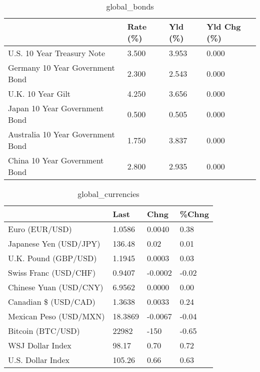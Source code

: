 \documentclass{article}%
\begin{document}
%


\begin{table}[htbp]%
\caption{global\_bonds}%
\centering%
\begin{adjustbox}{width=1\textwidth}%
\begin{tabular}{llll}
\toprule
                                  & Rate (\%) & Yld (\%) & Yld Chg (\%) \\
\midrule
       U.S. 10 Year Treasury Note &    3.500 &   3.953 &       0.000 \\
  Germany 10 Year Government Bond &    2.300 &   2.543 &       0.000 \\
                U.K. 10 Year Gilt &    4.250 &   3.656 &       0.000 \\
    Japan 10 Year Government Bond &    0.500 &   0.505 &       0.000 \\
Australia 10 Year Government Bond &    1.750 &   3.837 &       0.000 \\
    China 10 Year Government Bond &    2.800 &   2.935 &       0.000 \\
\bottomrule
\end{tabular}
%
\end{adjustbox}%
\end{table}

%


\begin{table}[htbp]%
\caption{global\_currencies}%
\centering%
\begin{adjustbox}{width=1\textwidth}%
\begin{tabular}{llll}
\toprule
                       &    Last &    Chng & \%Chng \\
\midrule
        Euro (EUR/USD) &  1.0586 &  0.0040 &  0.38 \\
Japanese Yen (USD/JPY) &  136.48 &    0.02 &  0.01 \\
  U.K. Pound (GBP/USD) &  1.1945 &  0.0003 &  0.03 \\
 Swiss Franc (USD/CHF) &  0.9407 & -0.0002 & -0.02 \\
Chinese Yuan (USD/CNY) &  6.9562 &  0.0000 &  0.00 \\
  Canadian \$ (USD/CAD) &  1.3638 &  0.0033 &  0.24 \\
Mexican Peso (USD/MXN) & 18.3869 & -0.0067 & -0.04 \\
     Bitcoin (BTC/USD) &   22982 &    -150 & -0.65 \\
      WSJ Dollar Index &   98.17 &    0.70 &  0.72 \\
     U.S. Dollar Index &  105.26 &    0.66 &  0.63 \\
\bottomrule
\end{tabular}
%
\end{adjustbox}%
\end{table}
\end{document}
